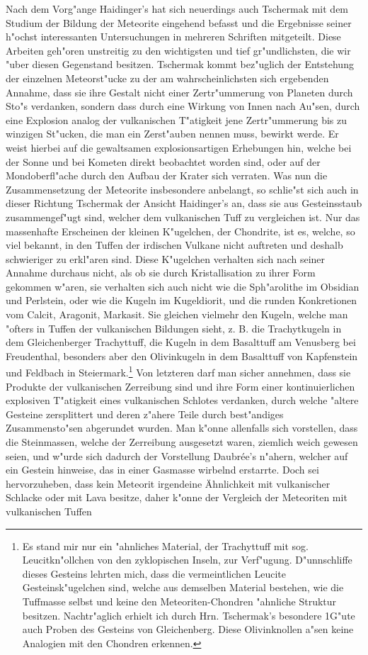 \documentclass[a4paper, 11pt, oneside]{article}
\begin{document}
Nach dem Vorg"ange Haidinger's hat sich neuerdings auch Tschermak mit dem Studium der Bildung der Meteorite eingehend befasst und die Ergebnisse seiner h"ochst interessanten Untersuchungen in mehreren Schriften mitgeteilt. Diese Arbeiten geh"oren unstreitig zu den wichtigsten und tief gr"undlichsten, die wir "uber diesen Gegenstand besitzen. Tschermak kommt bez"uglich der Entstehung der einzelnen Meteorst"ucke zu der am wahrscheinlichsten sich ergebenden Annahme, dass sie ihre Gestalt nicht einer Zertr"ummerung von Planeten durch Sto"s verdanken, sondern dass durch eine Wirkung von Innen nach Au"sen, durch eine Explosion analog der vulkanischen T"atigkeit jene Zertr"ummerung bis zu winzigen St"ucken, die man ein Zerst"auben nennen muss, bewirkt werde. Er weist hierbei auf die gewaltsamen explosionsartigen Erhebungen hin, welche bei der Sonne und bei Kometen direkt beobachtet worden sind, oder auf der Mondoberfl"ache durch den Aufbau der Krater sich verraten. Was nun die Zusammensetzung der Meteorite insbesondere anbelangt, so schlie"st sich auch in dieser Richtung Tschermak der Ansicht Haidinger's an, dass sie aus Gesteinsstaub zusammengef"ugt sind, welcher dem vulkanischen Tuff zu vergleichen ist. Nur das massenhafte Erscheinen der kleinen K"ugelchen, der Chondrite, ist es, welche, so viel bekannt, in den Tuffen der irdischen Vulkane nicht auftreten und deshalb schwieriger zu erkl"aren sind. Diese K"ugelchen verhalten sich nach seiner Annahme durchaus nicht, als ob sie durch Kristallisation zu ihrer Form gekommen w"aren, sie verhalten sich auch nicht wie die Sph"arolithe im Obsidian und Perlstein, oder wie die Kugeln im Kugeldiorit, und die runden Konkretionen vom Calcit, Aragonit, Markasit. Sie gleichen vielmehr den Kugeln, welche man "ofters in Tuffen der vulkanischen Bildungen sieht, z. B. die Trachytkugeln in dem Gleichenberger Trachyttuff, die Kugeln in dem Basalttuff am Venusberg bei Freudenthal, besonders aber den Olivinkugeln in dem Basalttuff von Kapfenstein und Feldbach in Steiermark.\footnote{Es stand mir nur ein "ahnliches Material, der Trachyttuff mit sog. Leucitkn"ollchen von den zyklopischen Inseln, zur Verf"ugung. D"unnschliffe dieses Gesteins lehrten mich, dass die vermeintlichen Leucite Gesteinsk"ugelchen sind, welche aus demselben Material bestehen, wie die Tuffmasse selbst und keine den Meteoriten-Chondren "ahnliche Struktur besitzen. Nachtr"aglich erhielt ich durch Hrn. Tschermak's besondere 1G"ute auch Proben des Gesteins von Gleichenberg. Diese Olivinknollen a"sen keine Analogien mit den Chondren erkennen.} Von letzteren darf man sicher annehmen, dass sie Produkte der vulkanischen Zerreibung sind und ihre Form einer kontinuierlichen explosiven T"atigkeit eines vulkanischen Schlotes verdanken, durch welche "altere Gesteine zersplittert und deren z"ahere Teile durch best"andiges Zusammensto"sen abgerundet wurden. Man k"onne allenfalls sich vorstellen, dass die Steinmassen, welche der Zerreibung ausgesetzt waren, ziemlich weich gewesen seien, und w"urde sich dadurch der Vorstellung Daubrée's n"ahern, welcher auf ein Gestein hinweise, das in einer Gasmasse wirbelnd erstarrte. Doch sei hervorzuheben, dass kein Meteorit irgendeine Ähnlichkeit mit vulkanischer Schlacke oder mit Lava besitze, daher k"onne der Vergleich der Meteoriten mit vulkanischen Tuffen 
\end{document}
